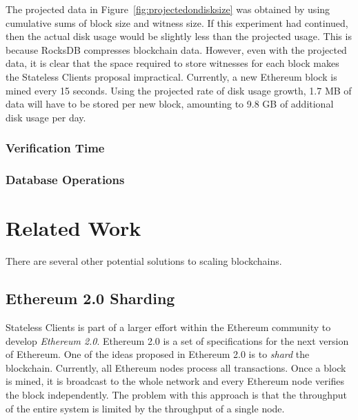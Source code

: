 \documentclass[12pt]{article}
\newcommand{\System}{Stateless Clients\xspace}
\begin{document}
The projected data in Figure~\ref{fig:projectedondisksize} was obtained by using cumulative sums of block size and witness size. If this experiment had continued, then the actual disk usage would be slightly less than the projected usage. This is because RocksDB compresses blockchain data. However, even with the projected data, it is clear that the space required to store witnesses for each block makes the \System proposal impractical. Currently, a new Ethereum block is mined every 15 seconds. Using the projected rate of disk usage growth, 1.7 MB of data will have to be stored per new block, amounting to 9.8 GB of additional disk usage per day.

\subsubsection{Verification Time}

\subsubsection{Database Operations}

\section{Related Work}

There are several other potential solutions to scaling blockchains.

\subsection{Ethereum 2.0 Sharding}

\iffalse

\System is part of a larger effort within the Ethereum community to develop \emph{Ethereum 2.0}. Ethereum 2.0 is a set of specifications for the next version of Ethereum. One of the ideas proposed in Ethereum 2.0 is to \emph{shard} the blockchain. Currently, all Ethereum nodes process all transactions. Once a block is mined, it is broadcast to the whole network and every Ethereum node verifies the block independently. The problem with this approach is that the throughput of the entire system is limited by the throughput of a single node.
\end{document}
